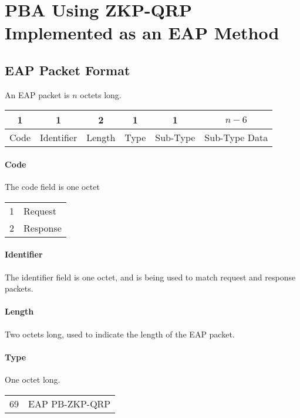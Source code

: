 \section{PBA Using ZKP-QRP Implemented as an EAP Method} %

\subsection{EAP Packet Format}
An EAP packet is $n$ octets long.


\begin{center}
\begin{tabular}{|c|c|c|c|c|c|}
	\hline
	1 & 1 & 2 & 1 & 1 & $n - 6$\\
	\hline
	Code & Identifier & Length & Type & Sub-Type & Sub-Type Data\\
	\hline 
\end{tabular}
\end{center}

\paragraph{Code}
The code field is one octet

\bigskip

\begin{tabular}{ll}
	1 & Request \\
	2 & Response\\
\end{tabular}

\paragraph{Identifier} The identifier field is one octet, and is being used to match request and response packets.

\paragraph{Length} Two octets long, used to indicate the length of the EAP packet.

\paragraph{Type} One octet long.

\bigskip

\begin{tabular}{ll} %
	69 & EAP PB-ZKP-QRP \\
\end{tabular}

